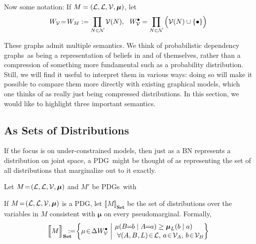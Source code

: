 \documentclass{article}
\newcommand\changed[1]{{\color{note-fg} #1}}
\newcommand\Set{\textbf{Set}}
\newcommand{\modelname}{probabilistic dependency graph}
\newcommand{\modelnames}{\modelname s}
\newcommand{\MN}{PDG}
\newcommand{\MNs}{\MN s}
\def\seq{\!=\!}
\begin{document}
	Now some notation: If $M = \mnvars[]$, let 
	$$W_{\cal V} \seq W_M :=  \prod_{N \in \mathcal N}\mathcal V(N),~~ W_{\cal V}^\bullet = \prod_{N \in \mathcal N}\Big(\mathcal V(N) \cup \{\bullet\} \Big)$$
			
	These graphs admit multiple semantics. We think of \modelnames\ as being a representation of beliefs in and of themselves, rather than a compression of something more fundamental such as a probability distribution. Still, we will find it useful to interpret them in various ways: doing so will make it possible to compare them more directly with existing graphical models, which one thinks of as really just being compressed distributions. In this section, we would like to highlight three important semantics.
	
	\subsection{As Sets of Distributions}\label{sec:set-of-distribution-semantics}
	If the focus is on under-constrained models, then just as a BN represents a distribution on joint space, a \MN\ might be thought of as representing the set of all distributions that marginalize out to it exactly. 
	
	
	\begin{defn}
		Let $M \!=\!\mnvars[]$ and $M'$ be \MNs\ with 
	\end{defn}
	

	
	\begin{defn}
		If $M\seq\mnvars[]$ is a \MN, let $\llbracket M \rrbracket_\Set$ be the set of distributions over the variables in $M$ consistent with $\boldsymbol\mu$ on every \changed{pseudomarginal}. Formally,		
		\[ \Big\llbracket M \Big\rrbracket_\Set \hspace{-2ex} := \!\left\{\mu \!\in\! \Delta W_{\cal V}^\bullet\ \middle|\!
		\begin{array}{l}
		\mu(B\!\! =\!\!b \mid A\!\!=\!\!a) \geq \boldsymbol\mu_L(b \mid a) \\[0.1em]
		~\text{$\forall (A, B, L) \!\in\! \mathcal L$, $a \!\in\!\mathcal V_A$, $b \!\in\! \mathcal V_B$} \end{array}\!\!\! \right\}\]
	\end{defn}
	
\end{document}
